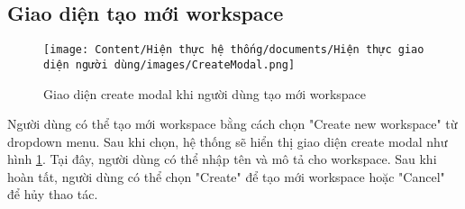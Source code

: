 \subsection{Giao diện tạo mới workspace}


\begin{figure}[H]
    \centering
    \texttt{[image: Content/Hiện thực hệ thống/documents/Hiện thực giao diện người dùng/images/CreateModal.png]}
    \vspace{0.5cm}
    \caption{Giao diện create modal khi người dùng tạo mới workspace}
    \label{fig: Giao diện create modal khi người dùng tạo mới workspace}
\end{figure}

Người dùng có thể tạo mới workspace bằng cách chọn "Create new workspace" từ dropdown menu. Sau khi chọn, hệ thống sẽ hiển thị giao diện create modal như hình \ref{fig: Giao diện create modal khi người dùng tạo mới workspace}. Tại đây, người dùng có thể nhập tên và mô tả cho workspace. Sau khi hoàn tất, người dùng có thể chọn "Create" để tạo mới workspace hoặc "Cancel" để hủy thao tác.